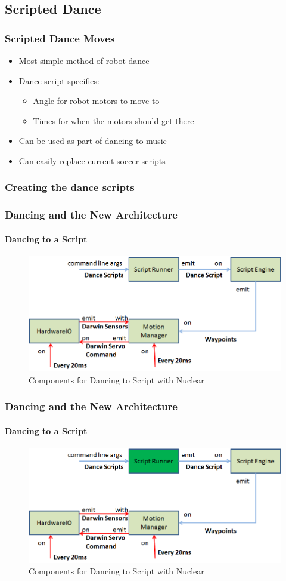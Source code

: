 \documentclass{beamer}
\begin{document}
	\subsection{Scripted Dance} %
	\begin{frame}
		\frametitle{Scripted Dance Moves}
		\begin{itemize}
			\item Most simple method of robot dance
			\item Dance script specifies:
			\begin{itemize}
				\item Angle for robot motors to move to
				\item Times for when the motors should get there
			\end{itemize}
			\item Can be used as part of dancing to music
			\item Can easily replace current soccer scripts
		\end{itemize}
	\end{frame}	
	\begin{frame}
		\frametitle{Creating the dance scripts}
	\end{frame}	
	\begin{frame}
		\frametitle{Dancing and the New Architecture}
		\framesubtitle{Dancing to a Script}
		\begin{figure}
			\centering
			\includegraphics[scale=.5]{Presentation_Images/dance_script_new_arc.png}
			\caption{Components for Dancing to Script with Nuclear}
		\end{figure}
	\end{frame}	
	\begin{frame}
		\frametitle{Dancing and the New Architecture}
		\framesubtitle{Dancing to a Script}
		\begin{figure}
			\centering
			\includegraphics[scale=.5]{Presentation_Images/dance_script_new_arc_change.png}
			\caption{Components for Dancing to Script with Nuclear}
		\end{figure}
	\end{frame}	
\end{document}
